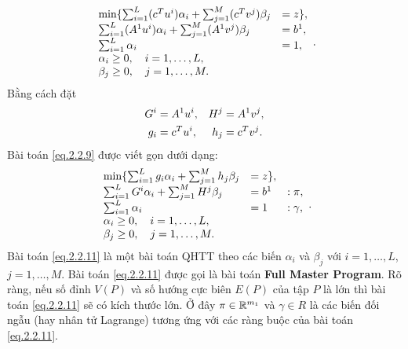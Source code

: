 \begin{equation}\label{eq.2.2.9}
 \begin{array}{ll}
\min \{\sum_{i = 1}^L (c^Tu^i)\alpha_i + \sum_{j = 1}^M (c^Tv^j)\beta_j & =z\},\\
\sum_{i = 1}^L (A^1u^i)\alpha_i + \sum_{j = 1}^M (A^1v^j)\beta_j & =b^1,\\
\sum_{i = 1}^L \alpha_i &= 1,\\
\alpha_i \geq 0, \quad i = 1, \ldots, L,\\
\beta_j \geq 0, \quad j = 1, \ldots, M.
\end{array} .
\end{equation}
Bằng cách đặt
\begin{align}\label{eq.2.2.10}
G^i &= A^1u^i, &H^j &= A^1v^j,\\
g_i &= c^Tu^i, &h_j &= c^Tv^j.\notag
\end{align}
Bài toán \eqref{eq.2.2.9} được viết gọn dưới dạng:
\begin{equation}\label{eq.2.2.11}
 \begin{array}{llll}
\min\{\sum_{i = 1}^L g_i\alpha_i + \sum_{j = 1}^M h_j\beta_j & =z\},\\
\sum_{i = 1}^L G^i \alpha_i + \sum_{j = 1}^M H^j \beta_j & = b^1 & :\pi,\\
\sum_{i = 1}^L \alpha_i & = 1 & :\gamma,\\
\alpha_i \geq 0,\quad i = 1, \ldots, L,\\
\beta_j \geq 0, \quad j = 1, \ldots, M.
\end{array}.
\end{equation}
Bài toán \eqref{eq.2.2.11} là một bài toán QHTT theo các biến $\alpha_i$ và $\beta_j$ với $i=1,\dots, L$, $j=1,\dots, M$. Bài toán \eqref{eq.2.2.11} được gọi là bài toán {\bf Full Master Program}. Rõ ràng, nếu số đỉnh $V(P)$ và số hướng cực biên $E(P)$ của tập $P$ là lớn thì bài toán \eqref{eq.2.2.11} sẽ có kích thước lớn. Ở đây $\pi\in {\mathbb R}^{m_1}$ và $\gamma \in R$ là các biến đối ngẫu (hay nhân tử Lagrange) tương ứng với các ràng buộc của bài toán \eqref{eq.2.2.11}.

